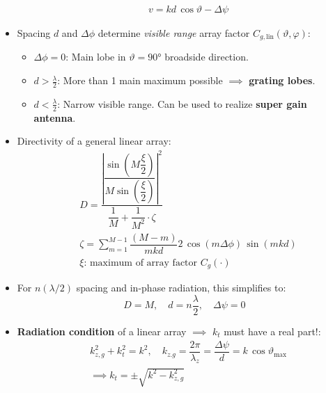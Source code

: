 \begin{itemize}
\begin{align*}
            &v = kd\,\cos\vartheta - \Delta\psi
        \end{align*}
    \item Spacing $d$ and $\Delta\phi$ determine \textit{visible range} array factor $C_{g,\mathrm{lin}}(\vartheta,\varphi)$:
        \begin{itemize}
            \itemsep0pt
            \item $\Delta\phi = 0$: Main lobe in $\vartheta = \ang{90}$ broadside direction.
            \item $d > \frac\lambda2$: More than 1 main maximum possible $\implies$ \textbf{grating lobes}.
            \item $d < \frac\lambda2$: Narrow visible range. Can be used to realize \textbf{super gain antenna}.
        \end{itemize}
    \item Directivity of a general linear array:
        \begin{align*}
            &D = \dfrac{\left|\dfrac{\sin\left( M\dfrac\xi2 \right)}{M\sin\left( \dfrac\xi2 \right)}\right|^2}{\dfrac{1}{M} + \dfrac{1}{M^2} \cdot \zeta}\\
            &\zeta = \sum\limits^{M-1}_{m=1}\dfrac{(M-m)}{mkd} 2\,\cos\left(m\Delta\phi\right)\,\sin(mkd)\\
            &\xi\text{: maximum of array factor } C_g(\cdot)
        \end{align*}
    \item For $n(\lambda/2)$ spacing and in-phase radiation, this simplifies to:
        \begin{equation*}
            D = M, \quad d = n\dfrac{\lambda}{2}, \quad \Delta\psi = 0
        \end{equation*}
    \item \textbf{Radiation condition} of a linear array $\implies$ $k_t$ must have a real part!:\\
        
        \begin{align*}
            &k_{z,g}^2 + k_t^2 = k^2, \quad k_{z.g} = \dfrac{2\pi}{\lambda_z}= \dfrac{\Delta\psi}{d} = k\,\cos\vartheta_{\mathrm{max}}\\
            &\implies k_t = \pm \sqrt{k^2 - k_{z,g}^2}\\
        \end{align*}
\end{itemize}

